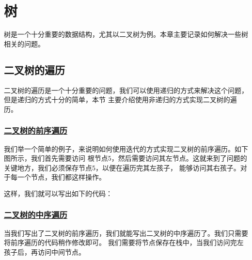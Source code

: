 \documentclass[../../main.tex]{subfiles}
\begin{document}
\setchapterpreamble[u]{\margintoc}

\chapter{树}

树是一个十分重要的数据结构，尤其以二叉树为例。本章主要记录如何解决一些树相关的问题。

\section{二叉树的遍历}

二叉树的遍历是一个十分重要的问题，我们可以使用递归的方式来解决这个问题，但是递归的方式十分的简单，本节
主要介绍使用非递归的方式实现二叉树的遍历。

\subsection{\href{https://leetcode.cn/problems/binary-tree-preorder-traversal/}
{二叉树的前序遍历}}

我们举一个简单的例子，来说明如何使用迭代的方式实现二叉树的前序遍历。如下图所示，我们首先需要访问
根节点5，然后需要访问其左节点。这就来到了问题的关键地方，我们必须保存节点5，以便在遍历完其左孩子，
能够访问其右孩子。对于每一个节点，我们都这样操作。


这样，我们就可以写出如下的代码：



\subsection{\href{https://leetcode.cn/problems/binary-tree-inorder-traversal/}
{二叉树的中序遍历}}

当我们写出了二叉树的前序遍历，我们就能写出二叉树的中序遍历了。我们只需要将前序遍历的代码稍作修改即可。
我们需要将节点保存在栈中，当我们访问完左孩子后，再访问中间节点。


\end{document}
